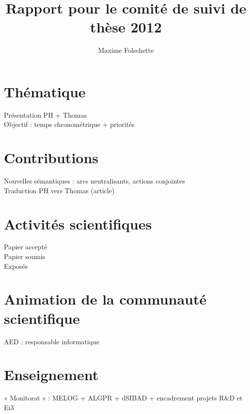 \documentclass{report}
\title{Rapport pour le comité de suivi de thèse 2012}
\author{Maxime Folschette}
\begin{document}
\maketitle

\tableofcontents

\chapter{Thématique}
Présentation PH + Thomas\\
Objectif : temps chronométrique + priorités

\chapter{Contributions}
Nouvelles sémantiques : arcs neutralisants, actions conjointes\\
Traduction PH vers Thomas (article)

\chapter{Activités scientifiques}
Papier accepté\\
Papier soumis\\
Exposés

\chapter{Animation de la communauté scientifique}
AED : responsable informatique

\chapter{Enseignement}
« Monitorat » : MELOG + ALGPR + dSIBAD + encadrement projets R\&D et Ei3
\end{document}
